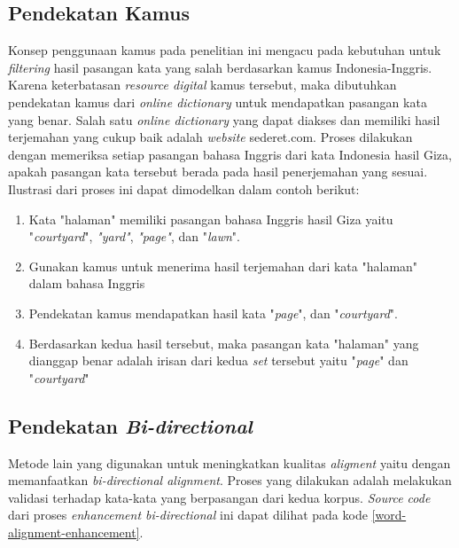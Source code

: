 \subsection{Pendekatan Kamus}

Konsep penggunaan kamus pada penelitian ini mengacu pada kebutuhan untuk \textit{filtering} hasil pasangan kata yang salah berdasarkan kamus Indonesia-Inggris. Karena keterbatasan \textit{resource digital} kamus tersebut, maka dibutuhkan pendekatan kamus dari \textit{online dictionary} untuk mendapatkan pasangan kata yang benar. Salah satu \textit{online dictionary} yang dapat diakses dan memiliki hasil terjemahan yang cukup baik adalah \textit{website} sederet.com. Proses dilakukan dengan memeriksa setiap pasangan bahasa Inggris dari kata Indonesia hasil Giza, apakah pasangan kata tersebut berada pada hasil penerjemahan yang sesuai. Ilustrasi dari proses ini dapat dimodelkan dalam contoh berikut:

\begin{enumerate}
	\item Kata "halaman" memiliki pasangan bahasa Inggris hasil Giza yaitu  "\textit{courtyard}", \textit{"yard"}, \textit{"page"}, dan "\textit{lawn}".
	\item Gunakan kamus untuk menerima hasil terjemahan dari kata "halaman" dalam bahasa Inggris
	\item Pendekatan kamus mendapatkan hasil kata "\textit{page}", dan "\textit{courtyard}".
	\item Berdasarkan kedua hasil tersebut, maka pasangan kata "halaman" yang dianggap benar adalah irisan dari kedua \textit{set} tersebut yaitu "\textit{page}" dan "\textit{courtyard}"
\end{enumerate}

\subsection{Pendekatan \textit{Bi-directional}}

Metode lain yang digunakan untuk meningkatkan kualitas \textit{aligment} yaitu dengan memanfaatkan \textit{bi-directional alignment}. Proses yang dilakukan adalah melakukan validasi terhadap kata-kata yang berpasangan  dari kedua korpus. \textit{Source code} dari proses \textit{enhancement bi-directional} ini dapat dilihat pada kode \ref{word-alignment-enhancement}.

\clearpage

